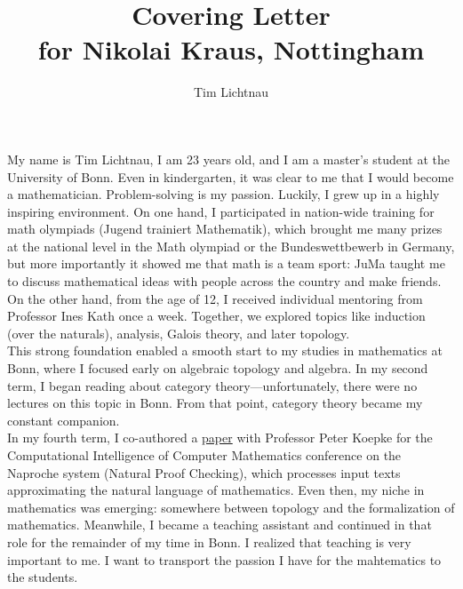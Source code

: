 \documentclass[12pt,headings=small,paper=A4,DIV=calc]{article}
\title{Covering Letter \\  for Nikolai Kraus, Nottingham}
\author{Tim Lichtnau}
\begin{document}
\maketitle
My name is Tim Lichtnau, I am 23 years old, and I am a master's student at the University of Bonn. Even in kindergarten, it was clear to me that I would become a mathematician. Problem-solving is my passion. Luckily, I grew up in a highly inspiring environment. On one hand, I participated in nation-wide training for math olympiads (Jugend trainiert Mathematik), which brought me many prizes at the national level in the Math olympiad or the Bundeswettbewerb in Germany, but more importantly it showed me that math is a team sport: JuMa taught me to discuss mathematical ideas with people across the country and make friends. On the other hand, from the age of 12, I received individual mentoring from Professor Ines Kath once a week. Together, we explored topics like induction (over the naturals), analysis, Galois theory, and later topology. \\

This strong foundation enabled a smooth start to my studies in mathematics at Bonn, where I focused early on algebraic topology and algebra. In my second term, I began reading about category theory---unfortunately, there were no lectures on this topic in Bonn. From that point, category theory became my constant companion. \\
In my fourth term, I co-authored a \href{https://ceur-ws.org/Vol-3377/natfom2.pdf}{paper} with Professor Peter Koepke for the Computational Intelligence of Computer Mathematics conference on the Naproche system (Natural Proof Checking), which processes input texts approximating the natural language of mathematics. Even then, my niche in mathematics was emerging: somewhere between topology and the formalization of mathematics. Meanwhile, I became a teaching assistant and continued in that role for the remainder of my time in Bonn. I realized that teaching is very important to me. I want to transport the passion I have for the mahtematics to the students.  \\
\end{document}
